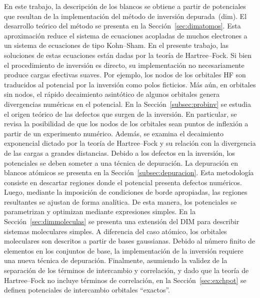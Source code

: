 En este trabajo, la descripción de los blancos se obtiene a partir de 
potenciales que resultan de la implementación del método de inversión 
depurada~(\acs{dim}). El desarrollo teórico del método se presenta en la 
Sección~\ref{sec:dimatomos}. Esta aproximación reduce el sistema de 
ecuaciones acopladas de muchos electrones a un sistema de ecuaciones de 
tipo Kohn--Sham. En el presente trabajo, las soluciones de estas 
ecuaciones están dadas por la teoría de Hartree--Fock. Si bien el 
procedimiento de inversión es directo, su implementación no 
necesariamente produce cargas efectivas suaves. Por ejemplo, los nodos 
de los orbitales HF son traducidos al potencial por la inversión como 
polos ficticios. Más aún, en orbitales sin nodos, el rápido decaimiento 
asintótico de algunos orbitales genera divergencias numéricas en el 
potencial. En la Sección~\ref{subsec:probinv} se estudia el origen 
teórico de las defectos que surgen de la inversión. En particular, se 
revisa la posibilidad de que los nodos de los orbitales sean puntos de 
inflexión a partir de un experimento numérico. Además, se examina el 
decaimiento exponencial dictado por la teoría de Hartree--Fock y su 
relación con la divergencia de las cargas a grandes distancias. Debido a 
los defectos en la inversión, los potenciales se deben someter a una 
técnica de depuración. La depuración en blancos atómicos se presenta en 
la Sección~\ref{subsec:depuracion}. Esta metodología consiste en 
descartar regiones donde el potencial presenta defectos numéricos. 
Luego, mediante la imposición de condiciones de borde apropiadas, las 
regiones resultantes se ajustan de forma analítica. De esta manera, los 
potenciales se parametrizan y optimizan mediante expresiones simples. 
En la Sección~\ref{sec:dimmoleculas} se presenta una extensión del DIM 
para describir sistemas moleculares simples. A diferencia del caso 
atómico, los orbitales moleculares son descritos a partir de bases 
gaussianas. Debido al número finito de elementos en los conjuntos de 
base, la implementación de la inversión requiere una nueva 
técnica de depuración. Finalmente, asumiendo la validez de la separación 
de los términos de intercambio y correlación, y dado que la teoría de 
Hartree--Fock no incluye términos de correlación, en la 
Sección~\ref{sec:exchpot} se definen potenciales de intercambio 
orbitales ``exactos''.

